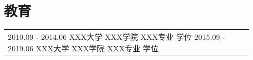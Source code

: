 \section*{教育}

\begin{tabular}{p{\textwidth}}
2010.09 - 2014.06 XXX大学 XXX学院 XXX专业 学位
2015.09 - 2019.06 XXX大学 XXX学院 XXX专业 学位
\end{tabular}